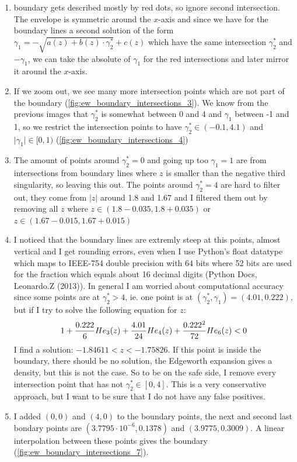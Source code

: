 \begin{enumerate}
    \item boundary gets described mostly by red dots, so ignore second intersection. The envelope is symmetric around the $x$-axis and since we have for the boundary lines a second solution of the form $\gamma_1=-\sqrt{a(z)+b(z)\cdot \gamma_2^*}+c(z)$ which have the same intersection $\gamma_2^*$ and $-\gamma_1$, we can take the absolute of $\gamma_1$ for the red intersections and later mirror it around the $x$-axis.
    \item If we zoom out, we see many more intersection points which are not part of the boundary (\ref{fig:ew_boundary_intersections_3}). We know from the previous images that $\gamma_2^*$ is somewhat between 0 and 4 and $\gamma_1$ between -1 and 1, so we restrict the intersection points to have $\gamma_2^*\in (-0.1,4.1)$ and $\vert \gamma_1\vert \in [0,1)$ (\ref{fig:ew_boundary_intersections_4})
    \item The amount of points around $\gamma_2^*=0$ and going up too $\gamma_1=1$ are from intersections from boundary lines where $z$ is smaller than the negative third singularity, so leaving this out. The points around $\gamma_2^*=4$ are hard to filter out, they come from $\vert z\vert$ around 1.8 and 1.67 and I filtered them out by removing all $z$ where $z\in (1.8-0.035, 1.8+0.035)$ or $z\in (1.67-0.015,1.67+0.015)$
    \item I noticed that the boundary lines are extremly steep at this points, almost vertical and I get rounding errors, even when I use Python's float datatype which maps to IEEE-754 double precision with 64 bits where 52 bits are used for the fraction which equals about 16 decimal digits (Python Docs, Leonardo.Z (2013)). In general I am worried about computational accuracy since some points are at $\gamma_2^*>4$, ie. one point is at $(\gamma_2^*, \gamma_1) = (4.01, 0.222)$, but if I try to solve the following equation for $z$:
    \begin{align}
        1 + \frac{0.222}{6}He_3(z) + \frac{4.01}{24}He_4(z) + \frac{0.222^2}{72}He_6(z)<0 \notag
    \end{align}
    I find a solution: $-1.84611<z<-1.75826$. If this point is inside the boundary, there should be no solution, the Edgeworth expansion gives a density, but this is not the case. So to be on the safe side, I remove every intersection point that has not $\gamma_2^*\in [0,4]$. This is a very conservative approach, but I want to be sure that I do not have any false positives.
    \item I added $(0,0)$ and $(4,0)$ to the boundary points, the next and second last bondary points are $(3.7795\cdot 10^{-6}, 0.1378)$ and $(3.9775, 0.3009)$. A linear interpolation between these points gives the boundary (\ref{fig:ew_boundary_intersections_7}).
\end{enumerate}

